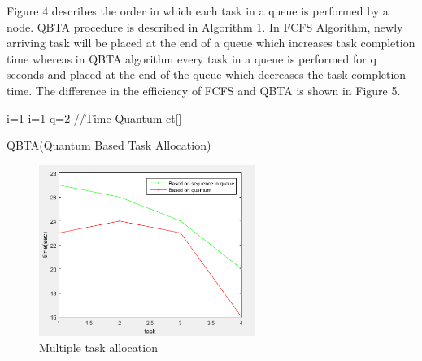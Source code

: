 \documentclass[conference]{IEEEtran}
\begin{document}
Figure 4 describes the order in which each task in a queue is performed by a node. QBTA procedure is described in Algorithm 1. In FCFS Algorithm, newly arriving task will be placed at the end of a queue which increases task completion time whereas in QBTA algorithm every task in a queue is performed for q seconds and placed at the end of the queue which decreases the task completion time. The difference in the efficiency of FCFS and QBTA is shown in Figure 5. 
\begin{algorithm}
\SetAlgoLined
  i=1 \;
i=1 \; 
q=2  //Time Quantum \;
  \Return ct[] \; 
 \caption{ QBTA(Quantum Based Task Allocation)}
\end{algorithm}
\begin{figure}[H]
\includegraphics[width=7cm,frame,center]{fig6.png}
  \caption{Multiple task allocation}
  \label{fig:6}
\end{figure}



\end{document}
